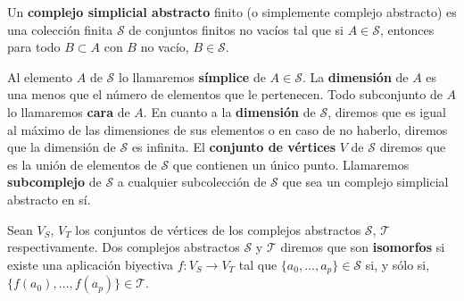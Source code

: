 \begin{definicion}
	Un \textbf{complejo simplicial abstracto} finito (o simplemente complejo abstracto)
	es una colección finita \(\mathcal{S}\) de conjuntos finitos no vacíos tal que
	si \(A \in \mathcal{S}\), entonces para todo \(B \subset A\) con \(B\) no vacío,
	\(B \in \mathcal{S}\).
\end{definicion}

Al elemento \(A\) de \(\mathcal{S}\) lo llamaremos \textbf{símplice} de
\(A \in \mathcal{S}\). La \textbf{dimensión} de \(A\) es una menos que el número de
elementos que le pertenecen. Todo subconjunto de \(A\) lo llamaremos \textbf{cara}
de \(A\). En cuanto a la \textbf{dimensión} de \(\mathcal{S}\), diremos que es igual
al máximo de las dimensiones de sus elementos o en caso de no haberlo, diremos
que la dimensión de \(\mathcal{S}\) es infinita. El \textbf{conjunto de vértices}
\(V\) de \(\mathcal{S}\) diremos que es la unión de elementos de \(\mathcal{S}\) que
contienen un único punto. Llamaremos \textbf{subcomplejo} de \(\mathcal{S}\) a
cualquier subcolección de \(\mathcal{S}\) que sea un complejo simplicial abstracto
en sí.

Sean \(V_{S}\), \(V_{T}\) los conjuntos de vértices de los complejos abstractos \(\mathcal{S}\),
\(\mathcal{T}\) respectivamente. Dos complejos abstractos \(\mathcal{S}\) y \(\mathcal{T}\)
diremos que son \textbf{isomorfos} si existe una aplicación biyectiva
\(f: V_{S}\rightarrow V_{T}\) tal que \(\{a_{0}, \ldots, a_{p}\} \in \mathcal{S}\) si,
y sólo si, \(\{f(a_{0}), \ldots, f(a_{p})\} \in \mathcal{T}\).

